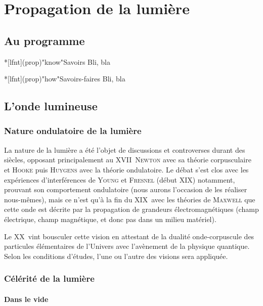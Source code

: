 \documentclass[../../main/main.tex]{subfiles}
\begin{document}
\chapter{Propagation de la lumi\`ere}

\section*{Au programme}
\begin{tcb}*[lfnt](prop)"know"{Savoirs}
	Bli, bla
\end{tcb}

\begin{tcb}*[lfnt](prop)"how"{Savoirs-faires}
	Bli, bla
\end{tcb}

\section{L'onde lumineuse}

\subsection{Nature ondulatoire de la lumière}

La nature de la lumière a été l'objet de discussions et controverses durant des
siècles, opposant principalement au XVII\ieme\ \textsc{Newton} avec sa théorie
corpusculaire et \textsc{Hooke} puis \textsc{Huygens} avec la théorie
ondulatoire. Le débat s'est clos avec les expériences d'interférences de
\textsc{Young} et \textsc{Fresnel} (début XIX\ieme) notamment, prouvant son
comportement ondulatoire (nous aurons l'occasion de les réaliser nous-mêmes),
mais ce n'est qu'à la fin du XIX\ieme\ avec les théories de \textsc{Maxwell} que
cette onde est décrite par la propagation de grandeurs électromagnétiques (champ
électrique, champ magnétique, et donc pas dans un milieu matériel).

Le XX\ieme\ vint bousculer cette vision en attestant de la dualité
onde-corpuscule des particules élémentaires de l'Univers avec l'avènement de la
physique quantique. Selon les conditions d'études, l'une ou l'autre des visions
sera appliquée.

\subsection{Célérité de la lumière}

\subsubsection{Dans le vide}
\end{document}
